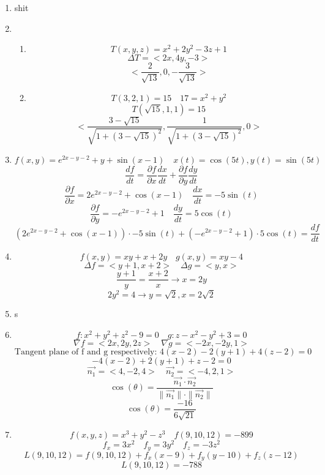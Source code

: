 \documentclass[12pt]{article}
\begin{document}
\maketitle \begin{enumerate}

\item shit

\item \begin{enumerate}
\item 
$$T(x, y, z) = x^2 +2y^2 - 3z + 1$$
$$\Delta T  = <2x, 4y, -3>$$
$$<\frac{2}{\sqrt{13}}, 0, -\frac{3}{\sqrt{13}}>$$
\item $$T(3, 2, 1) = 15 \quad 17 = x^2 + y^2$$
$$T(\sqrt{15},1, 1) = 15$$
$$<\frac{3-\sqrt{15}}{\sqrt{1+(3-\sqrt{15})^2}}, \frac{1}{\sqrt{1+(3-\sqrt{15})^2}}, 0>$$
\end{enumerate}

\item $$f(x, y) = e^{2x-y-2}+y+\sin(x-1) \quad x(t) = \cos (5t), y(t) = \sin (5t)$$
$$\frac{df}{dt} = \frac{\partial f}{\partial x} \frac{dx}{dt} + \frac{\partial f}{\partial y} \frac{dy}{dt}$$
$$\frac{\partial f}{\partial x} = 2e^{2x-y-2}+\cos(x-1) \quad \frac{dx}{dt} = -5\sin(t)$$
$$\frac{\partial f}{\partial y} = -e^{2x-y-2}+1 \quad \frac{dy}{dt} = 5\cos(t)$$
$$\left(2e^{2x-y-2}+\cos(x-1)\right)\cdot-5\sin(t) + \left(-e^{2x-y-2}+1\right)\cdot5\cos(t) = \frac{df}{dt}$$

\item $$f(x, y) = xy + x + 2y \quad g(x, y) = xy - 4$$
$$\Delta f = <y+1,x+2> \quad \Delta g = <y, x>$$
$$\frac{y+1}{y} = \frac{x+2}{x} \rightarrow x=2y$$
$$2y^2=4 \rightarrow y=\sqrt{2}, x = 2\sqrt{2}$$

\item s
\item $$f:x^2+y^2+z^2-9=0 \quad g:z-x^2-y^2+3=0$$
$$\nabla f = <2x,2y,2z> \quad \nabla g = <-2x,-2y,1>$$
$$\textrm{Tangent plane of f and g respectively: } 4(x-2)-2(y+1)+4(z-2)=0$$
$$-4(x-2)+2 (y+1)+z-2=0$$
$$\vec{n_1} = <4,-2,4> \quad \vec{n_2} = <-4, 2,1>$$
$$\cos(\theta) = \frac{\vec{n_1} \cdot \vec{n_2}}{\parallel \vec{n_1} \parallel \cdot \parallel \vec{n_2} \parallel}$$
$$\cos(\theta) = \frac{-16}{6\sqrt{21}}$$
\item $$f\left(x,y,z\right)=x^3+y^2-z^3 \quad f\left(9,10,12\right) = -899$$
$$f_x = 3x^2 \quad f_y = 3y^2 \quad f_z = -3z^2$$
$$L(9,10,12) = f(9,10,12) + f_x(x-9)+f_y(y-10)+f_z(z-12)$$
$$L(9,10,12) = -788$$


\end{enumerate}
\end{document}
